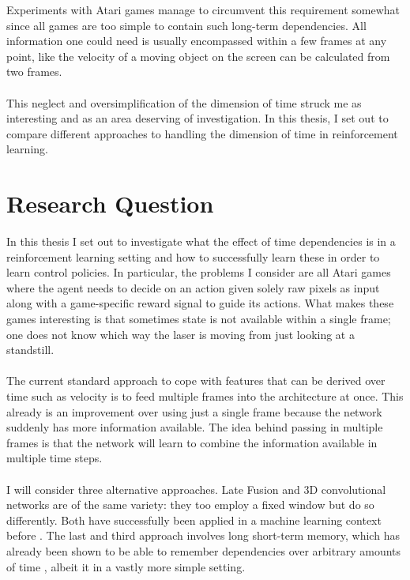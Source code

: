 Experiments with Atari games
manage to circumvent this requirement somewhat
since all games are too simple
to contain such long-term dependencies.
All information one could need is usually encompassed
within a few frames at any point,
like the velocity of a moving object on the screen
can be calculated from two frames.

\paragraph{}
This neglect and oversimplification of the dimension of time
struck me as interesting and as an area
deserving of investigation.
In this thesis,
I set out to compare different approaches
to handling the dimension of time in reinforcement learning.

\section{Research Question}
\label{sec:research_question}
In this thesis I set out to investigate
what the effect of time dependencies is
in a reinforcement learning setting
and how to successfully learn these
in order to learn control policies.
In particular,
the problems I consider
are all Atari games
where the agent needs to decide on an action
given solely raw pixels as input
along with a game-specific reward signal
to guide its actions.
What makes these games interesting is that sometimes
state is not available within a single frame;
one does not know which way the laser is moving
from just looking at a standstill.

\paragraph{}
The current standard approach to cope with
features that can be derived over time such as velocity
is to feed multiple frames into the architecture at once.
This already is an improvement over using just a single frame
because the network suddenly has more information available.
The idea behind passing in multiple frames
is that the network will learn to combine the information
available in multiple time steps.

\paragraph{}
I will consider three alternative approaches.
Late Fusion and 3D convolutional networks
are of the same variety:
they too employ a fixed window but
do so differently.
Both have successfully been applied in a machine learning context before
\parencite{Karpathy2014,Ji2013}.
The last and third approach involves
long short-term memory,
which has already been shown to be able to remember
dependencies over arbitrary amounts of time
\parencite{Bakker2001},
albeit it in a vastly more simple setting.


